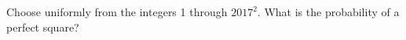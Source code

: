 Choose uniformly from the integers 1 through $ 2017^2 $. What is the probability of a perfect square?
